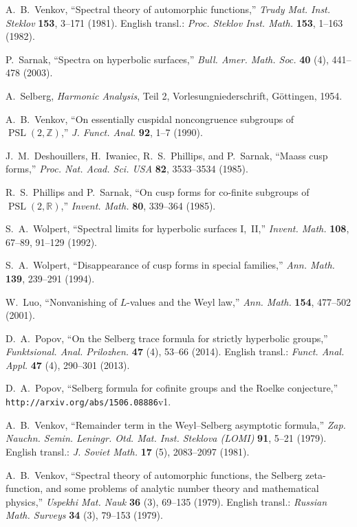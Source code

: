 \documentclass{amsart}
\theoremstyle{plain}
\theoremstyle{definition}
\numberwithin{equation}{section}
\begin{document}
\begin{thebibliography}{99}

A.~B.~Venkov,
``Spectral theory of automorphic functions,''
\textit{Trudy Mat. Inst. Steklov}
\textbf{153}, 3--171
(1981).
English transl.:
\textit{Proc. Steklov Inst. Math.}
\textbf{153},
1--163 (1982).


P.~Sarnak,
``Spectra on hyperbolic surfaces,''
\textit{Bull. Amer. Math. Soc.}
\textbf{40}
(4), 441--478
(2003).

A.~Selberg,
\textit{Harmonic Analysis}, Teil 2,
Vorlesungniederschrift,
G\"ottingen,
1954.

A.~B.~Venkov,
``On essentially cuspidal noncongruence subgroups
of $\operatorname{PSL}(2,\mathbb{Z})$,''
\textit{J. Funct. Anal.}
\textbf{92}, 1--7
(1990).

J.~M.~Deshouillers, H.~Iwaniec, R.~S.~Phillips, and P.~Sarnak,
``Maass cusp forms,''
\textit{Proc. Nat. Acad. Sci. USA}
\textbf{82}, 3533--3534
(1985).

R.~S.~Phillips and P.~Sarnak,
``On cusp forms for co-finite subgroups
of $\operatorname{PSL}(2,\mathbb{R})$,''
\textit{Invent. Math.}
\textbf{80}, 339--364
(1985).

S.~A.~Wolpert,
``Spectral limits for hyperbolic surfaces {\rm I,~II},''
\textit{Invent. Math.}
\textbf{108}, 67--89, 91--129
(1992).

S.~A.~Wolpert,
``Disappearance of cusp forms in special families,''
\textit{Ann. Math.}
\textbf{139}, 239--291
(1994).

W.~Luo,
``Nonvanishing of $L$-values and the Weyl law,''
\textit{Ann. Math.}
\textbf{154}, 477--502
(2001).

D.~A.~Popov,
``On the Selberg trace formula for strictly hyperbolic groups,''
\textit{Funktsional. Anal. Prilozhen.}
\textbf{47}
(4), 53--66
(2014).
English transl.:
\textit{Funct. Anal. Appl.}
\textbf{47}
(4), 290--301
(2013).

D.~A.~Popov,
``Selberg formula for cofinite groups and the Roelke conjecture,''
\texttt{http://arxiv.org/abs/1506.08886}v1.

A.~B.~Venkov,
``Remainder term in the Weyl--Selberg asymptotic formula,''
\textit{Zap. Nauchn. Semin. Leningr. Otd. Mat. Inst. Steklova (LOMI)}
\textbf{91}, 5--21
(1979).
English transl.:
\textit{J. Soviet Math.}
\textbf{17}
(5), 2083--2097
(1981).

A.~B.~Venkov,
``Spectral theory of automorphic functions,
       the Selberg zeta-function, and some problems
       of analytic number theory and mathematical physics,''
\textit{Uspekhi Mat. Nauk}
\textbf{36} (3),
69--135
(1979).
English transl.:
\textit{Russian Math. Surveys}
\textbf{34} (3), 79--153
(1979).



\end{thebibliography}
\end{document}
